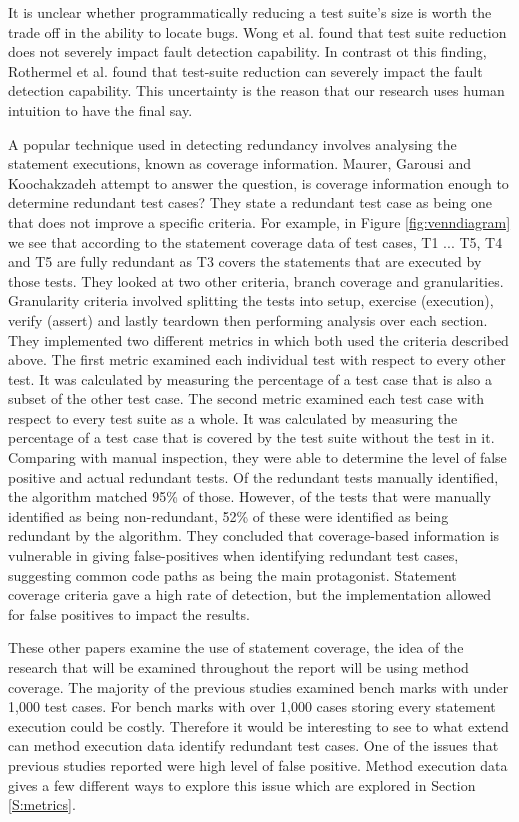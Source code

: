 It is unclear whether programmatically reducing a test suite's size is worth the trade off in the ability to locate bugs.  Wong et al. \cite{wong1995effect, wong1999test} found that test suite reduction does not severely impact fault detection capability. In contrast ot this finding, Rothermel et al. \cite{rothermel1998empirical, rothermel2002empirical} found that test-suite reduction can severely impact the fault detection capability. This uncertainty is the reason that our research uses human intuition to have the final say.

A popular technique used in detecting redundancy involves analysing the statement executions, known as coverage information. Maurer, Garousi and Koochakzadeh \cite{koochakzadeh2009test} attempt to answer the question, is coverage information enough to determine redundant test cases? They state a redundant test case as being one that does not improve a specific criteria. For example, in Figure \ref{fig:venndiagram} we see that according to the statement coverage data of test cases, T1 ... T5, T4 and T5 are fully redundant as T3 covers the statements that are executed by those tests. They looked at two other criteria, branch coverage and granularities. Granularity criteria involved splitting the tests into setup, exercise (execution), verify (assert) and lastly teardown then performing analysis over each section. They implemented two different metrics in which both used the criteria described above. The first metric examined each individual test with respect to every other test. It was calculated by measuring the percentage of a test case that is also a subset of the other test case. The second metric examined each test case with respect to every test suite as a whole. It was calculated by measuring the percentage of a test case that is covered by the test suite without the test in it. Comparing with manual inspection, they were able to determine the level of false positive and actual redundant tests. Of the redundant tests manually identified, the algorithm matched 95\% of those. However, of the tests that were manually identified as being non-redundant, 52\% of these were identified as being redundant by the algorithm. They concluded that coverage-based information is vulnerable in giving false-positives when identifying redundant test cases, suggesting common code paths as being the main protagonist. Statement coverage criteria gave a high rate of detection, but the implementation allowed for false positives to impact the results. 

These other papers examine the use of statement coverage, the idea of the research that will be examined throughout the report will be using method coverage. The majority of the previous studies examined bench marks with under 1,000 test cases. For bench marks with over 1,000 cases storing every statement execution could be costly. Therefore it would be interesting to see to what extend can method execution data identify redundant test cases. One of the issues that previous studies reported were high level of false positive. Method execution data gives a few different ways to explore this issue which are explored in Section \ref{S:metrics}.

